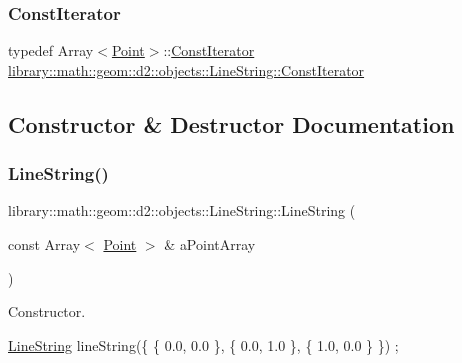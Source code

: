 \subsubsection{\texorpdfstring{Const\+Iterator}{ConstIterator}}
{\footnotesize\ttfamily typedef Array$<$\hyperlink{classlibrary_1_1math_1_1geom_1_1d2_1_1objects_1_1_point}{Point}$>$\+::\hyperlink{classlibrary_1_1math_1_1geom_1_1d2_1_1objects_1_1_line_string_a7c7a81b557da8ed855b5f4b88a5fa837}{Const\+Iterator} \hyperlink{classlibrary_1_1math_1_1geom_1_1d2_1_1objects_1_1_line_string_a7c7a81b557da8ed855b5f4b88a5fa837}{library\+::math\+::geom\+::d2\+::objects\+::\+Line\+String\+::\+Const\+Iterator}}



\subsection{Constructor \& Destructor Documentation}
\mbox{\label{classlibrary_1_1math_1_1geom_1_1d2_1_1objects_1_1_line_string_aa313a076051c7fb722b9eeb6d5bf2f7e}} 
\subsubsection{\texorpdfstring{Line\+String()}{LineString()}}
{\footnotesize\ttfamily library\+::math\+::geom\+::d2\+::objects\+::\+Line\+String\+::\+Line\+String (\begin{DoxyParamCaption}\item[{const Array$<$ \hyperlink{classlibrary_1_1math_1_1geom_1_1d2_1_1objects_1_1_point}{Point} $>$ \&}]{a\+Point\+Array }\end{DoxyParamCaption})}



Constructor. 


\begin{DoxyCode}
\hyperlink{classlibrary_1_1math_1_1geom_1_1d2_1_1objects_1_1_line_string_aa313a076051c7fb722b9eeb6d5bf2f7e}{LineString} lineString(\{ \{ 0.0, 0.0 \}, \{ 0.0, 1.0 \}, \{ 1.0, 0.0 \} \}) ;
\end{DoxyCode}



